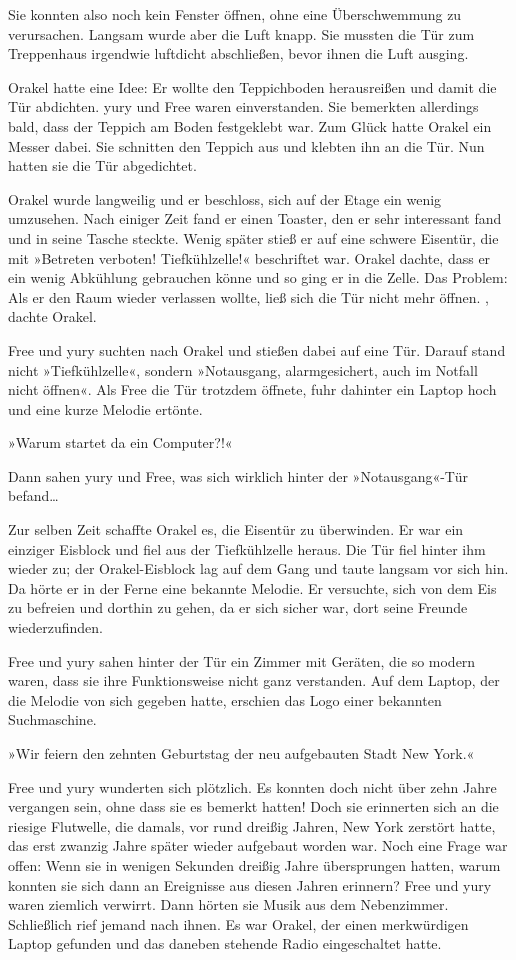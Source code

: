 Sie konnten also noch kein Fenster öffnen, ohne eine Überschwemmung zu verursachen. Langsam wurde aber die Luft knapp. Sie mussten die Tür zum Treppenhaus irgendwie luftdicht abschließen, bevor ihnen die Luft ausging.

Orakel hatte eine Idee: Er wollte den Teppichboden herausreißen und damit die Tür abdichten. yury und Free waren einverstanden. Sie bemerkten allerdings bald, dass der Teppich am Boden festgeklebt war. Zum Glück hatte Orakel ein Messer dabei. Sie schnitten den Teppich aus und klebten ihn an die Tür. Nun hatten sie die Tür abgedichtet.

Orakel wurde langweilig und er beschloss, sich auf der Etage ein wenig umzusehen. Nach einiger Zeit fand er einen Toaster, den er sehr interessant fand und in seine Tasche steckte. Wenig später stieß er auf eine schwere Eisentür, die mit »Betreten verboten! Tiefkühlzelle!« beschriftet war. Orakel dachte, dass er ein wenig Abkühlung gebrauchen könne und so ging er in die Zelle. Das Problem: Als er den Raum wieder verlassen wollte, ließ sich die Tür nicht mehr öffnen. , dachte Orakel.

Free und yury suchten nach Orakel und stießen dabei auf eine Tür. Darauf stand nicht »Tiefkühlzelle«, sondern »Notausgang, alarmgesichert, auch im Notfall nicht öffnen«. Als Free die Tür trotzdem öffnete, fuhr dahinter ein Laptop hoch und eine kurze Melodie ertönte.

»Warum startet da ein Computer?!«

Dann sahen yury und Free, was sich wirklich hinter der »Notausgang«-Tür befand…

Zur selben Zeit schaffte Orakel es, die Eisentür zu überwinden. Er war ein einziger Eisblock und fiel aus der Tiefkühlzelle heraus. Die Tür fiel hinter ihm wieder zu; der Orakel-Eisblock lag auf dem Gang und taute langsam vor sich hin. Da hörte er in der Ferne eine bekannte Melodie. Er versuchte, sich von dem Eis zu befreien und dorthin zu gehen, da er sich sicher war, dort seine Freunde wiederzufinden.

Free und yury sahen hinter der Tür ein Zimmer mit Geräten, die so modern waren, dass sie ihre Funktionsweise nicht ganz verstanden. Auf dem Laptop, der die Melodie von sich gegeben hatte, erschien das Logo einer bekannten Suchmaschine.

»Wir feiern den zehnten Geburtstag der neu aufgebauten Stadt New York.«

Free und yury wunderten sich plötzlich. Es konnten doch nicht über zehn Jahre vergangen sein, ohne dass sie es bemerkt hatten! Doch sie erinnerten sich an die riesige Flutwelle, die damals, vor rund dreißig Jahren, New York zerstört hatte, das erst zwanzig Jahre später wieder aufgebaut worden war. Noch eine Frage war offen: Wenn sie in wenigen Sekunden dreißig Jahre übersprungen hatten, warum konnten sie sich dann an Ereignisse aus diesen Jahren erinnern? Free und yury waren ziemlich verwirrt. Dann hörten sie Musik aus dem Nebenzimmer. Schließlich rief jemand nach ihnen. Es war Orakel, der einen merkwürdigen Laptop gefunden und das daneben stehende Radio eingeschaltet hatte.

